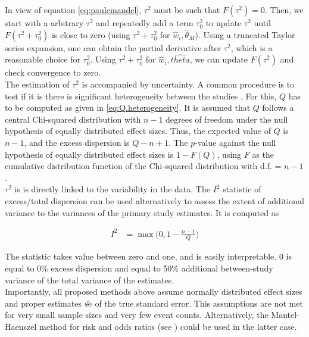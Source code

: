 \documentclass[11pt,a4paper,twoside]{book}\usepackage[]{graphicx}\usepackage[]{color}
\begin{document}
In view of equation \eqref{eq:paulemandel}, $\tau^2$ must be such that $F(\tau^2) = 0$. Then, we start with a arbitrary $\tau^2$ and repeatedly add a term $\tau_0^2$ to update $\tau^2$ until $F(\tau^2 + \tau_0^2)$ is close to zero (using $\tau^2 + \tau_0^2$ for $\hat{w}_i, \hat{\theta}_M$). Using a truncated Taylor series expansion, one can obtain the partial derivative after $\tau^2$, which is a reasonable choice for $\tau_0^2$. Using $\tau^2 + \tau_0^2$ for $\hat{w}_i, \hat{theta}$, we can update $F(\tau^2)$ and check convergence to zero. \\
The estimation of $\tau^2$ is accompanied by uncertainty. A common procedure is to test if it is there is significant heterogeneity between the studies \cite[109]{Intro.meta}. For this, $Q$ has to be computed as given in \eqref{eq:Q.heterogeneity}. It is assumed that $Q$ follows a central Chi-squared distribution with $n -1$ degrees of freedom under the null hypothesis of equally distributed effect sizes. Thus, the expected value of $Q$ is $n-1$, and the excess dispersion is $Q - n + 1$. The $p$\hspace{0.4mm}-value against the null hypothesis of equally distributed effect sizes is $1 - F(Q)$, using $F$ as the cumulative distribution function of the Chi-squared distribution with d.f. = $n-1$. \\
$\tau^2$ is  is directly linked to the variability in the data. The $I^2$ statistic of excess/total dispersion can be used alternatively to assess the extent of additional variance to the variances of the primary study estimates. It is computed as

\begin{align}
I^2 &= \max\Big(0, 1 - \frac{n-1}{Q}\Big) \nonumber%
\end{align}

The statistic takes value between zero and one, and is easily interpretable. 0 is equal to 0\% excess dispersion and  equal to 50\% additional between-study variance of the total variance of the estimates. \\
Importantly, all proposed methods above assume normally distributed effect sizes and proper estimates $\hat{\operatorname{se}}$ of the true standard error. This assumptions are not met for very small sample sizes and very few event counts. Alternatively, the Mantel-Haenszel method for risk and odds ratios (see \eg \citet{mantel.haenszel}) could be used in the latter case. 
\end{document}

